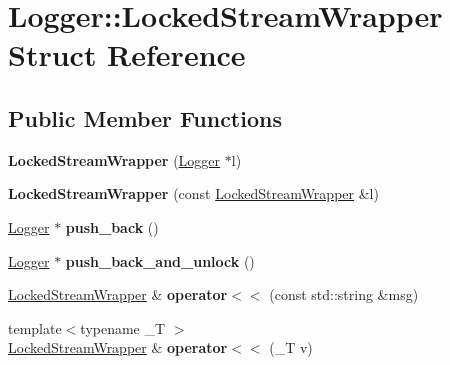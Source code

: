 \hypertarget{struct_logger_1_1_locked_stream_wrapper}{
\section{Logger::LockedStreamWrapper Struct Reference}
\label{struct_logger_1_1_locked_stream_wrapper}
}
\subsection*{Public Member Functions}
\begin{DoxyCompactItemize}
\item 
\hypertarget{struct_logger_1_1_locked_stream_wrapper_abd9fab73f3fafaff6aa438f8adf4ec33}{
{\bfseries LockedStreamWrapper} (\hyperlink{struct_logger}{Logger} $\ast$l)}
\label{struct_logger_1_1_locked_stream_wrapper_abd9fab73f3fafaff6aa438f8adf4ec33}

\item 
\hypertarget{struct_logger_1_1_locked_stream_wrapper_a89181c72f25beccf0fdf541167c9d54d}{
{\bfseries LockedStreamWrapper} (const \hyperlink{struct_logger_1_1_locked_stream_wrapper}{LockedStreamWrapper} \&l)}
\label{struct_logger_1_1_locked_stream_wrapper_a89181c72f25beccf0fdf541167c9d54d}

\item 
\hypertarget{struct_logger_1_1_locked_stream_wrapper_aa27aceea48c1dcb5be9d1a2c6dfa38f2}{
\hyperlink{struct_logger}{Logger} $\ast$ {\bfseries push\_\-back} ()}
\label{struct_logger_1_1_locked_stream_wrapper_aa27aceea48c1dcb5be9d1a2c6dfa38f2}

\item 
\hypertarget{struct_logger_1_1_locked_stream_wrapper_a43e46f10b7600b4ae3b5c58149026d43}{
\hyperlink{struct_logger}{Logger} $\ast$ {\bfseries push\_\-back\_\-and\_\-unlock} ()}
\label{struct_logger_1_1_locked_stream_wrapper_a43e46f10b7600b4ae3b5c58149026d43}

\item 
\hypertarget{struct_logger_1_1_locked_stream_wrapper_a28024f6a1eb855db38b25cc0c45d5512}{
\hyperlink{struct_logger_1_1_locked_stream_wrapper}{LockedStreamWrapper} \& {\bfseries operator$<$$<$} (const std::string \&msg)}
\label{struct_logger_1_1_locked_stream_wrapper_a28024f6a1eb855db38b25cc0c45d5512}

\item 
\hypertarget{struct_logger_1_1_locked_stream_wrapper_a3656f9d6473f0e76e00d969483ab0374}{
{\footnotesize template$<$typename \_\-T $>$ }\\\hyperlink{struct_logger_1_1_locked_stream_wrapper}{LockedStreamWrapper} \& {\bfseries operator$<$$<$} (\_\-T v)}
\label{struct_logger_1_1_locked_stream_wrapper_a3656f9d6473f0e76e00d969483ab0374}


\end{DoxyCompactItemize}
